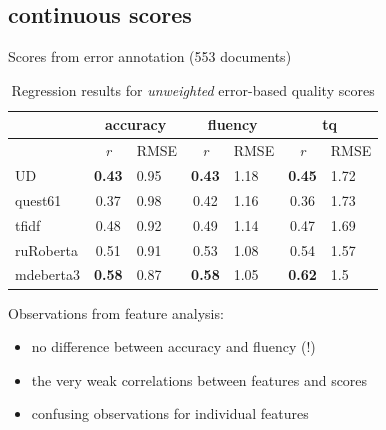 \documentclass[11pt]{beamer} %
\begin{document}
\subsection{continuous scores}
\begin{frame}{Scores from error annotation (553 documents)}
	
		\begin{table}[H]
		\centering
		\begin{tabular}{l|cl|cl|cl}
			\toprule
			& \multicolumn{2}{c|}{accuracy} & \multicolumn{2}{c|}{fluency}  & \multicolumn{2}{c}{tq} \\
			\midrule
			& \textit{r}  & RMSE & \textit{r}  & RMSE & \textit{r}  & RMSE\\
			\midrule
			UD     & \textbf{0.43} & 0.95 & \textbf{0.43} & 1.18 & \textbf{0.45} & 1.72\\
			quest61         & 0.37 & 0.98 & 0.42 & 1.16 & 0.36 & 1.73\\
			\midrule
			tfidf           & 0.48 & 0.92 & 0.49 & 1.14 & 0.47 & 1.69\\
			ruRoberta & 0.51 & 0.91 & 0.53 & 1.08 & 0.54 & 1.57\\
			mdeberta3  & \textbf{0.58} & 0.87 & \textbf{0.58} & 1.05 & \textbf{0.62} & 1.5\\
		\end{tabular}
		\caption{Regression results for \textit{unweighted} error-based quality scores}
	\end{table}

Observations from feature analysis: 
\begin{itemize}
	\item no difference between accuracy and fluency (!)
	\item the very weak correlations between features and scores 
	\item confusing observations for individual features
\end{itemize}
	
\end{frame}
\end{document}
